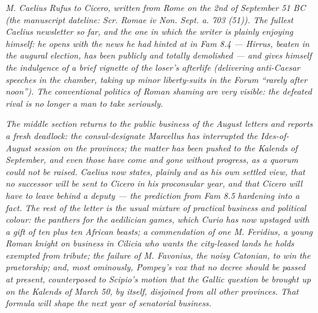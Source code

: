
\textit{M. Caelius Rufus to Cicero, written from Rome
on the 2nd of September 51 BC (the manuscript dateline:
\textit{Scr. Romae iv Non. Sept. a. 703 (51)}). The
fullest Caelius newsletter so far, and the one in which
the writer is plainly enjoying himself: he opens with
the news he had hinted at in \textit{Fam} 8.4 ---
Hirrus, beaten in the augural election, has been
publicly and totally demolished --- and gives himself
the indulgence of a brief vignette of the loser's
afterlife (delivering anti-Caesar speeches in the
chamber, taking up minor liberty-suits in the Forum
``rarely after noon''). The conventional politics of
Roman shaming are very visible: the defeated rival is
no longer a man to take seriously.}

\textit{The middle section returns to the public
business of the August letters and reports a fresh
deadlock: the consul-designate Marcellus has interrupted
the Ides-of-August session on the provinces; the matter
has been pushed to the Kalends of September, and even
those have come and gone without progress, as a quorum
could not be raised. Caelius now states, plainly and as
his own settled view, that no successor will be sent
to Cicero in his proconsular year, and that Cicero will
have to leave behind a deputy --- the prediction from
\textit{Fam} 8.5 hardening into a fact. The rest of the
letter is the usual mixture of practical business and
political colour: the panthers for the aedilician
games, which Curio has now upstaged with a gift of ten
plus ten African beasts; a commendation of one M.
Feridius, a young Roman knight on business in Cilicia
who wants the city-leased lands he holds exempted from
tribute; the failure of M. Favonius, the noisy Catonian,
to win the praetorship; and, most ominously, Pompey's
\textit{vox} that no decree should be passed at present,
counterposed to Scipio's motion that the Gallic question
be brought up on the Kalends of March 50, by itself,
disjoined from all other provinces. That formula will
shape the next year of senatorial business.}
